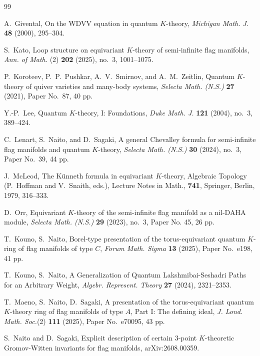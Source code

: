 \documentclass{amsart}
\numberwithin{equation}{section}
\begin{document}
\begin{thebibliography}{99}


A.~Givental,
On the WDVV equation in quantum $K$-theory, 
\emph{Michigan Math. J.} \textbf{48} (2000), 295--304. 

S.~Kato,
Loop structure on equivariant $K$-theory of semi-infinite flag manifolds,
\emph{Ann. of Math.} (2) \textbf{202} (2025), no.~3, 1001--1075.

P.~Koroteev, P.~P.~Pushkar, A.~V.~Smirnov, and A.~M.~Zeitlin,
Quantum \(K\)-theory of quiver varieties and many-body systems,
\emph{Selecta Math. (N.S.)} \textbf{27} (2021), Paper No.~87, 40 pp.

Y.-P.~Lee, 
Quantum $K$-theory, I: Foundations, 
\emph{Duke Math. J.} \textbf{121} (2004), no.~3, 389--424. 

C.~Lenart, S.~Naito, and D.~Sagaki,
A general Chevalley formula for semi-infinite flag manifolds and quantum $K$-theory,
\textit{Selecta Math. (N.S.)} \textbf{30} (2024), no.~3, Paper No.~39, 44 pp.

J.~McLeod, The K\"unneth formula in equivariant $K$-theory, Algebraic Topology (P.~Hoffman and V.~Snaith, eds.), Lecture Notes in Math., \textbf{741}, Springer, Berlin, 1979, 316--333.

D.~Orr, Equivariant $K$-theory of the semi-infinite flag manifold as a nil-DAHA module, \emph{Selecta Math. (N.S.)} \textbf{29} (2023), no.~3, Paper No. 45, 26 pp.

T.~Kouno, S.~Naito,
Borel-type presentation of the torus-equivariant quantum $K$-ring of flag manifolds of type $C$,
\emph{Forum Math. Sigma} \textbf{13} (2025), Paper No.~e198, 41 pp.

T.~Kouno, S.~Naito,
A Generalization of Quantum Lakshmibai-Seshadri Paths
for an Arbitrary Weight, \emph{Algebr. Represent. Theory} \textbf{27} (2024), 2321--2353.

T.~Maeno, S.~Naito, D.~Sagaki, 
A presentation of the torus-equivariant quantum $K$-theory ring of flag manifolds of type $A$, Part I: The defining ideal,
\emph{J. Lond. Math. Soc.}(2) \textbf{111} (2025), Paper No.~e70095, 43 pp.

S.~Naito and D.~Sagaki, Explicit description of certain 3-point $K$-theoretic Gromov-Witten invariants for flag manifolds, arXiv:2608.00359. 

\end{thebibliography}
\end{document}
